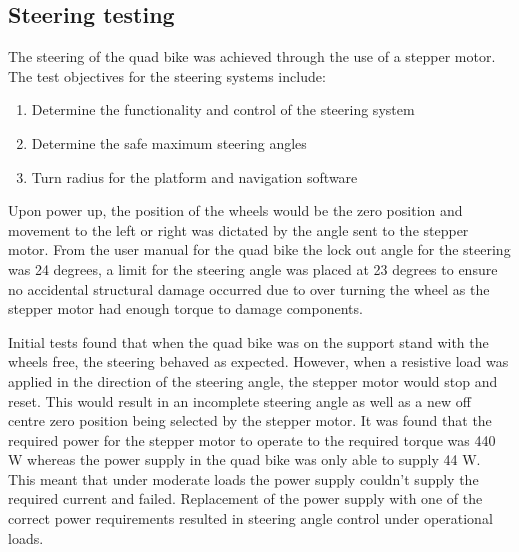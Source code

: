 \documentclass[main.tex]{subfiles}
\begin{document}
\subsection{Steering testing}
The steering of the quad bike was achieved through the use of a stepper motor. The test objectives for the steering systems include:
\begin{enumerate}
\item Determine the functionality and control of the steering system 
\item Determine the safe maximum steering angles
\item Turn radius for the platform and navigation software
\end{enumerate}
Upon power up, the position of the wheels would be the zero position and movement to the left or right was dictated by the angle sent to the stepper motor. From the user manual for the quad bike the lock out angle for the steering was 24 degrees, a limit for the steering angle was placed at 23 degrees to ensure no accidental structural damage occurred due to over turning the wheel as the stepper motor had enough torque to damage components.

Initial tests found that when the quad bike was on the support stand with the wheels free, the steering behaved as expected. However, when a resistive load was applied in the direction of the steering angle, the stepper motor would stop and reset. This would result in an incomplete steering angle as well as a new off centre zero position being selected by the stepper motor.  It was found that the required power for the stepper motor to operate to the required torque was 440 W whereas the power supply in the quad bike was only able to supply 44 W. This meant that under moderate loads the power supply couldn't supply the required current and failed. Replacement of the power supply with one of the correct power requirements resulted in steering angle control under operational loads.
\end{document}

